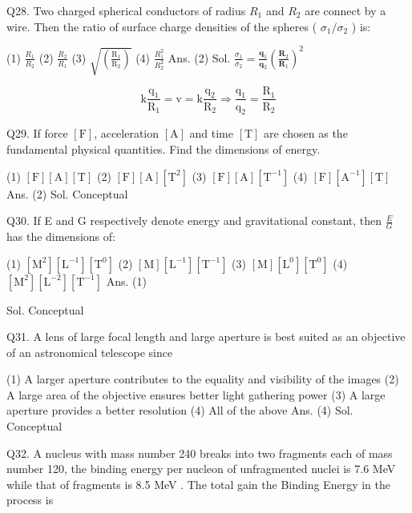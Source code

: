 \begin{enumerate}
Q28. Two charged spherical conductors of radius $R_{1}$ and $R_{2}$ are connect by a wire. Then the ratio of surface charge densities of the spheres ( $\sigma_{1} / \sigma_{2}$ ) is:

(1) $\frac{R_{1}}{R_{2}}$
(2) $\frac{R_{2}}{R_{1}}$
(3) $\sqrt{\left(\frac{\mathrm{R}_{1}}{\mathrm{R}_{2}}\right)}$
(4) $\frac{R_{1}^{2}}{R_{2}^{2}}$
Ans. (2)
Sol. $\frac{\sigma_{1}}{\sigma_{2}}=\frac{\mathbf{q}_{1}}{\mathbf{q}_{2}}\left(\frac{\mathbf{R}_{2}}{\mathbf{R}_{1}}\right)^{2}$

$$
\mathrm{k} \frac{\mathrm{q}_{1}}{\mathrm{R}_{1}}=\mathrm{v}=\mathrm{k} \frac{\mathrm{q}_{2}}{\mathrm{R}_{2}} \Rightarrow \frac{\mathrm{q}_{1}}{\mathrm{q}_{2}}=\frac{\mathrm{R}_{1}}{\mathrm{R}_{2}}
$$

Q29. If force $[\mathrm{F}]$, acceleration $[\mathrm{A}]$ and time $[\mathrm{T}]$ are chosen as the fundamental physical quantities. Find the dimensions of energy.

(1) $[\mathrm{F}][\mathrm{A}][\mathrm{T}]$
(2) $[\mathrm{F}][\mathrm{A}]\left[\mathrm{T}^{2}\right]$
(3) $[\mathrm{F}][\mathrm{A}]\left[\mathrm{T}^{-1}\right]$
(4) $[\mathrm{F}]\left[\mathrm{A}^{-1}\right][\mathrm{T}]$
Ans. (2)
Sol. Conceptual

Q30. If E and G respectively denote energy and gravitational constant, then $\frac{E}{G}$ has the dimensions of:

(1) $\left[\mathrm{M}^{2}\right]\left[\mathrm{L}^{-1}\right]\left[\mathrm{T}^{0}\right]$
(2) $[\mathrm{M}]\left[\mathrm{L}^{-1}\right]\left[\mathrm{T}^{-1}\right]$
(3) $[\mathrm{M}]\left[\mathrm{L}^{0}\right]\left[\mathrm{T}^{0}\right]$
(4) $\left[\mathrm{M}^{2}\right]\left[\mathrm{L}^{-2}\right]\left[\mathrm{T}^{-1}\right]$
Ans. (1)

Sol. Conceptual

Q31. A lens of large focal length and large aperture is best suited as an objective of an astronomical telescope since

(1) A larger aperture contributes to the equality and visibility of the images
(2) A large area of the objective ensures better light gathering power
(3) A large aperture provides a better resolution
(4) All of the above
Ans. (4)
Sol. Conceptual

Q32. A nucleus with mass number 240 breaks into two fragments each of mass number 120, the binding energy per nucleon of unfragmented nuclei is 7.6 MeV while that of fragments is 8.5 MeV . The total gain the Binding Energy in the process is


\end{enumerate}
